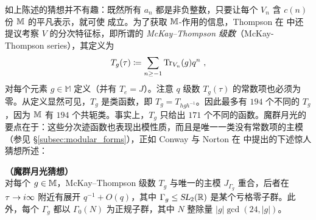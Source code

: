 如上陈述的猜想并不有趣：既然所有 $a_n$ 都是非负整数，只要让每个 $V_n$ 含 $c(n)$ 份 $\mathbb{M}$ 的平凡表示，就可使  成立。为了获取 $\mathbb{M}$-作用的信息，Thompson 在 \cite{Tho_FinGpsModFns} 中还提议考察 $V$ 的分次特征标，即所谓的 \emph{McKay–Thompson 级数}（McKay-Thompson series），其定义为
\begin{equation}
T_g(\tau)\coloneqq\sum_{n\geq-1}\operatorname{Tr}_{V_n}(g)q^n~,
\end{equation}
对每个元素 $g\in\mathbb M$ 定义（并有 $T_e=J$）。注意 $q$ 级数 $T_g(\tau)$ 的常数项也必须为零。从定义显然可见，$T_g$ 是类函数，即 $T_g=T_{hgh^{-1}}$。因此最多有 $194$ 个不同的 $T_g$，因为 $\mathbb{M}$ 有 $194$ 个共轭类。事实上，$T_g$ 只给出 $171$ 个不同的函数。魔群月光的要点在于：这些分次迹函数也表现出模性质，而且是唯一一类没有常数项的主模（参见 \S\ref{subsec:modular_forms}），正如 Conway 与 Norton 在 \cite{conway_norton} 中提出的下述惊人猜想所述：



{\conj \label{conj:conwa_norton}  {\bf（魔群月光猜想）}\\
对每个 $g\in \mathbb{M}$，McKay–Thompson 级数 $T_g$ 与唯一的主模 $J_{\Gamma_g}$ 重合，后者在 $\tau\to i\infty$ 附近有展开 $q^{-1}+O(q)$，其中 $\Gamma_g\leq\operatorname{\textsl{SL}}_2(\mathbb{R})$ 是某个亏格零子群。此外，每个 $\Gamma_g$ 都以 $\Gamma_0(N)$ 为正规子群，其中 $N$ 整除量 $|g|\gcd(24,|g|)$。
}


